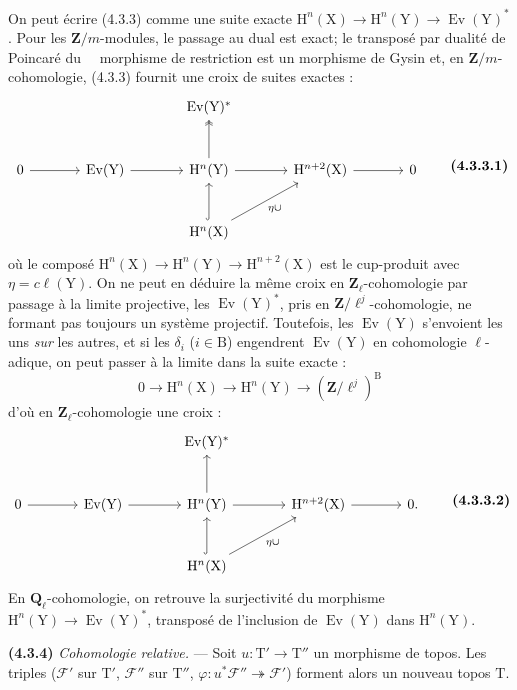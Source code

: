 \documentclass[11pt,leqno]{article}
\newcommand{\Page}[1]{\ifvmode\noindent\else\unskip\ \fi{\footnotesize\textcolor{gray}{[p.\,#1]}}\ \ignorespaces}
\begin{document}
On peut écrire (4.3.3) comme une suite exacte \(\mathrm{H}^n(\mathrm{X})\to\mathrm{H}^n(\mathrm{Y})\to\operatorname{Ev}(\mathrm{Y})^*\). Pour les \(\mathbf{Z}/m\)-modules, le passage au dual est exact; le transposé par dualité de Poincaré du
\Page{223}morphisme de restriction est un morphisme de Gysin et, en \(\mathbf{Z}/m\)-cohomologie, (4.3.3) fournit une croix de suites exactes :
\[
\begin{tikzcd}[column sep=large,row sep=large]
{} & {} & \operatorname{Ev}(\mathrm{Y})^* & {} & {} \\
0 \arrow[r]
  & \operatorname{Ev}(\mathrm{Y}) \arrow[r]
  & \mathrm{H}^n(\mathrm{Y}) \arrow[r] \arrow[u,two heads]
  & \mathrm{H}^{n+2}(\mathrm{X}) \arrow[r]
  & 0 \\
{} & {}
  & \mathrm{H}^n(\mathrm{X}) \arrow[u,hook] \arrow[ur,"\eta\cup"']
  & {} & {}
\end{tikzcd}
\tag*{\textbf{(4.3.3.1)}}
\]
où le composé \(\mathrm{H}^n(\mathrm{X})\to\mathrm{H}^n(\mathrm{Y})\to\mathrm{H}^{n+2}(\mathrm{X})\) est le cup-produit avec \(\eta=c\ell(\mathrm{Y})\). On ne peut en déduire la même croix en \(\mathbf{Z}_\ell\)-cohomologie par passage à la limite projective, les \(\operatorname{Ev}(\mathrm{Y})^*\), pris en \(\mathbf{Z}/\ell^j\)-cohomologie, ne formant pas toujours un système projectif. Toutefois, les \(\operatorname{Ev}(\mathrm{Y})\) s’envoient les uns \textit{sur} les autres, et si les \(\delta_i\) (\(i\in\mathrm{B}\)) engendrent \(\operatorname{Ev}(\mathrm{Y})\) en cohomologie \(\ell\)-adique, on peut passer à la limite dans la suite exacte :
\[
0\to\mathrm{H}^n(\mathrm{X})
\to\mathrm{H}^n(\mathrm{Y})
\to(\mathbf{Z}/\ell^j)^{\mathrm{B}}
\]
d’où en \(\mathbf{Z}_\ell\)-cohomologie une croix :
\[
\begin{tikzcd}[column sep=large,row sep=large]
{} & {} & \operatorname{Ev}(\mathrm{Y})^* & {} & {} \\
0 \arrow[r]
  & \operatorname{Ev}(\mathrm{Y}) \arrow[r]
  & \mathrm{H}^n(\mathrm{Y}) \arrow[r] \arrow[u]
  & \mathrm{H}^{n+2}(\mathrm{X}) \arrow[r]
  & 0. \\
{} & {}
  & \mathrm{H}^n(\mathrm{X}) \arrow[u,hook] \arrow[ur,"\eta\cup"']
  & {} & {}
\end{tikzcd}
\tag*{\textbf{(4.3.3.2)}}
\]
En \(\mathbf{Q}_\ell\)-cohomologie, on retrouve la surjectivité du morphisme \(\mathrm{H}^n(\mathrm{Y})\to\operatorname{Ev}(\mathrm{Y})^*\), transposé de l’inclusion de \(\operatorname{Ev}(\mathrm{Y})\) dans \(\mathrm{H}^n(\mathrm{Y})\).

\textbf{(4.3.4)} \textit{Cohomologie relative.} — Soit \(u:\mathrm{T}'\to\mathrm{T}''\) un morphisme de topos. Les triples (\(\mathscr{F}'\) sur \(\mathrm{T}'\), \(\mathscr{F}''\) sur \(\mathrm{T}''\), \(\varphi:u^*\mathscr{F}''\twoheadrightarrow\mathscr{F}'\)) forment alors un nouveau topos \(\mathrm{T}\).
\end{document}
